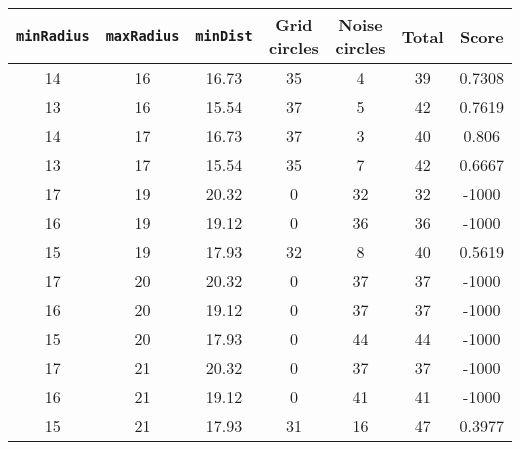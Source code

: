 \documentclass[letterpaper, 12pt]{article}
\begin{document}
\begin{longtable}{|c|c|c|c|c|c|c|}
\hline
\textbf{\texttt{minRadius}} & \textbf{\texttt{maxRadius}} & \textbf{\texttt{minDist}} & \textbf{Grid circles} & \textbf{Noise circles} & \textbf{Total} & \textbf{Score} \\
\hline
14 & 16 & 16.73 & 35 & 4 & 39 & 0.7308 \\
\hline
13 & 16 & 15.54 & 37 & 5 & 42 & 0.7619 \\
\hline
14 & 17 & 16.73 & 37 & 3 & 40 & 0.806 \\
\hline
13 & 17 & 15.54 & 35 & 7 & 42 & 0.6667 \\
\hline
17 & 19 & 20.32 & 0 & 32 & 32 & -1000 \\
\hline
16 & 19 & 19.12 & 0 & 36 & 36 & -1000 \\
\hline
15 & 19 & 17.93 & 32 & 8 & 40 & 0.5619 \\
\hline
17 & 20 & 20.32 & 0 & 37 & 37 & -1000 \\
\hline
16 & 20 & 19.12 & 0 & 37 & 37 & -1000 \\
\hline
15 & 20 & 17.93 & 0 & 44 & 44 & -1000 \\
\hline
17 & 21 & 20.32 & 0 & 37 & 37 & -1000 \\
\hline
16 & 21 & 19.12 & 0 & 41 & 41 & -1000 \\
\hline
15 & 21 & 17.93 & 31 & 16 & 47 & 0.3977 \\
\hline
\end{longtable}
\end{document}
